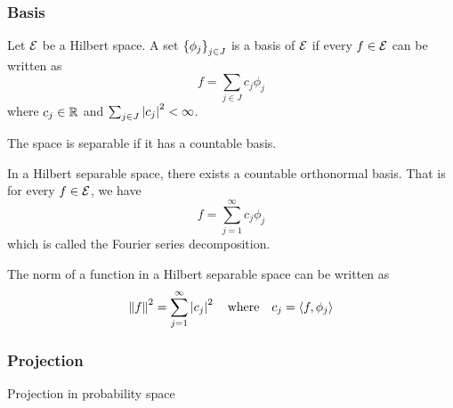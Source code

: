 \subsubsection{Basis}
\begin{definition}
    Let $\mathcal{E}$ be a Hilbert space. A set $\left\{\phi_j\right\}_{j\in J}$ is a basis of $\mathcal{E}$ if every $f\in\mathcal{E}$ can be written as
    \begin{equation*}
        f=\sum_{j\in J}c_j\phi_j
    \end{equation*}
    where $c_j\in\mathbb{R}$ and $\sum_{j\in J}\left| c_j\right|^2<\infty$.

\end{definition}
The space is separable if it has a countable basis.
\begin{theorem}
    In a Hilbert separable space, there exists a countable orthonormal basis.
    That is for every $f\in\mathcal{E}$, we have
    \begin{equation*}
        f=\sum_{j=1}^{\infty}c_j\phi_j
    \end{equation*} which is called the Fourier series decomposition.
\end{theorem}
The norm of a function in a Hilbert separable space can be written as
\begin{equation*}
    \left\| f \right\|^2=\sum_{j=1}^{\infty}\left| c_j\right|^2 \quad \text{where} \quad c_j=\left\langle f,\phi_j\right\rangle
\end{equation*}

\subsubsection{Projection}
{\color{blue}Projection in probability space}

